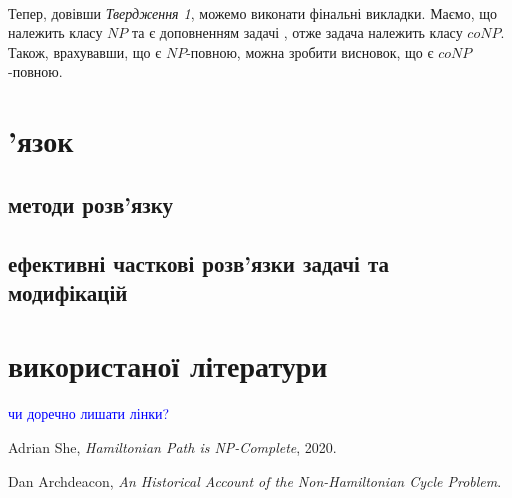 \documentclass[14pt]{article}
\begin{document}
\begin{spacing}{1.175}
    \\
    \quad Тепер, довівши \textit{Твердження 1}, можемо виконати фінальні викладки. Маємо, що \hamcycle належить класу \(NP\) та \nonhamcycle є доповненням задачі \hamcycle, отже задача \nonhamcycle належить класу \(coNP\). Також, врахувавши, що \hamcycle є \(NP\)-повною, можна зробити висновок, що \nonhamcycle є  \(coNP\)-повною.
        

    \section{'язок}
        \subsection{ методи розв'язку}
        \subsection{ ефективні часткові розв'язки задачі та модифікацій}

    \section{ використаної літератури}
    \textcolor{blue}{чи доречно лишати лінки?}
    \begin{thebibliography}{9}
        \item Adrian She, \emph{Hamiltonian Path is NP-Complete}, 2020.
        \item Dan Archdeacon, \emph{An Historical Account of the Non-Hamiltonian Cycle Problem}.
    \end{thebibliography}


    
	\end{spacing}
\end{document}
